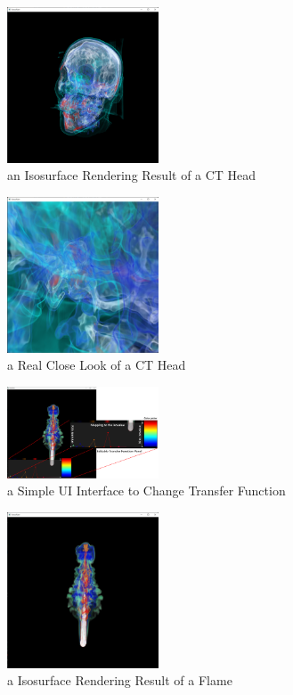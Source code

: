 \documentclass[sigconf]{acmart}
\begin{document}
\begin{figure}[]
\center
\includegraphics[width=0.4\textwidth]{imgs/cthead.png}
\caption{an Isosurface Rendering Result of a CT Head}
\end{figure}
\begin{figure}[]
\center
\includegraphics[width=0.4\textwidth]{imgs/close_look.png}
\caption{a Real Close Look of a CT Head}
\end{figure}

\begin{figure}[]
\center
\includegraphics[width=0.4\textwidth]{imgs/panel.png}
\caption{a Simple UI Interface to Change Transfer Function}
\end{figure}

\begin{figure}[]
\center
\includegraphics[width=0.4\textwidth]{imgs/flame.png}
\caption{a Isosurface Rendering Result of a Flame}
\end{figure}
\end{document}
